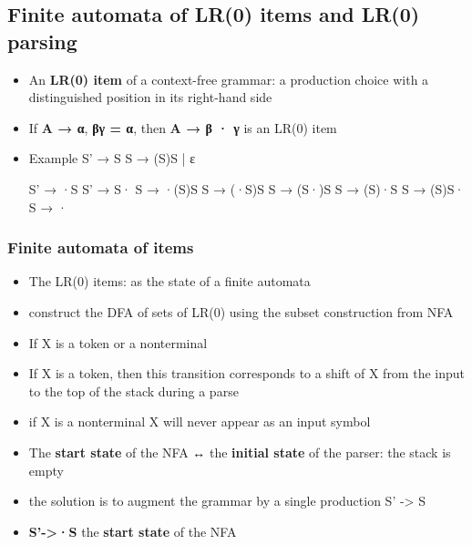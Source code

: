 \documentclass[11pt]{article}
\begin{document}
\subsection{Finite automata of LR(0) items and LR(0) parsing}
\label{sec:orgeb36e07}
\begin{itemize}
\item An \textbf{LR(0) item} of a context-free grammar: a production choice with a
distinguished position in its right-hand side
\item If \textbf{A → α}, \textbf{βγ = α}, then \textbf{A → β · γ} is an LR(0) item
\item Example
S' → S
S → (S)S | ε

S' → ·S
S' → S·
S → ·(S)S
S → (·S)S
S → (S·)S
S → (S)·S
S → (S)S·
S → ·
\end{itemize}
\subsubsection{Finite automata of items}
\label{sec:org66b2f99}
\begin{itemize}
\item The LR(0) items: as the state of a finite automata
\item construct the DFA of sets of LR(0) using the subset construction from NFA
\item If X is a token or a nonterminal
\item If X is a token, then this transition corresponds to a shift of X from the
input to the top of the stack during a parse
\item if X is a nonterminal
X will never appear as an input symbol
\item The \textbf{start state} of the NFA ↔ the \textbf{initial state} of the parser: the stack is
empty
\item the solution is to augment the grammar by a single production S' -> S
\item \textbf{S'->·S} the \textbf{start state} of the NFA
\end{itemize}
\end{document}
